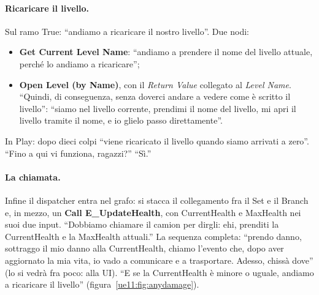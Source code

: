 \paragraph{Ricaricare il livello.} Sul ramo True: ``andiamo a ricaricare il nostro
livello''. Due nodi:
\begin{itemize}
  \item \textbf{Get Current Level Name}: ``andiamo a prendere il nome del livello attuale,
        perché lo andiamo a ricaricare'';
  \item \textbf{Open Level (by Name)}, con il \emph{Return Value} collegato al
        \emph{Level Name}. ``Quindi, di conseguenza, senza doverci andare a vedere come è
        scritto il livello'': ``siamo nel livello corrente, prendimi il nome del livello,
        mi apri il livello tramite il nome, e io glielo passo direttamente''.
\end{itemize}
In Play: dopo dieci colpi ``viene ricaricato il livello quando siamo arrivati a zero''.
``Fino a qui vi funziona, ragazzi?'' ``Sì.''

\paragraph{La chiamata.} Infine il dispatcher entra nel grafo: si stacca il collegamento
fra il Set e il Branch e, in mezzo, un \textbf{Call E\_UpdateHealth}, con CurrentHealth e
MaxHealth nei suoi due input. ``Dobbiamo chiamare il camion per dirgli: ehi, prenditi la
CurrentHealth e la MaxHealth attuali.'' La sequenza completa: ``prendo danno, sottraggo il
mio danno alla CurrentHealth, chiamo l'evento che, dopo aver aggiornato la mia vita, io
vado a comunicare e a trasportare. Adesso, chissà dove'' (lo si vedrà fra poco: alla UI).
``E se la CurrentHealth è minore o uguale, andiamo a ricaricare il livello''
(figura~\ref{ue11:fig:anydamage}).

